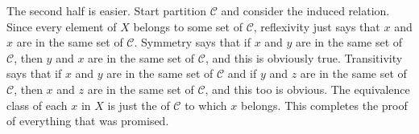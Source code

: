 The second half is easier. Start partition $\mathcal{C}$ and consider the induced relation. Since every element of $X$ belongs to some set of $\mathcal{C}$, reflexivity just says that $x$ and $x$ are in the same set of $\mathcal{C}$. Symmetry says that if $x$ and $y$ are in the same set of $\mathcal{C}$, then $y$ and $x$ are in the same set of $\mathcal{C}$, and this is obviously true.  Transitivity says that if $x$ and $y$ are in the same set of $\mathcal{C}$ and if $y$ and $z$ are in the same set of $\mathcal{C}$, then $x$ and $z$ are in the same set of $\mathcal{C}$, and this too is obvious. The equivalence class of each $x$ in $X$ is just the of $\mathcal{C}$ to which $x$ belongs. This completes the proof of everything that was promised.
